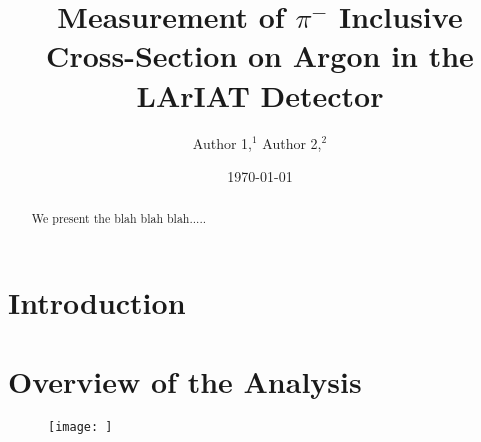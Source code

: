 \documentclass[%
 reprint,
 amsmath,amssymb,
 aps,
]{revtex4-1}
\begin{document}

\title{Measurement of $\pi^{-}$ Inclusive Cross-Section on Argon in the LArIAT Detector}%


\author{Author 1,$^{1}$ Author 2,$^{2}$ \\}



\date{\today}%

\begin{abstract}
We present the blah blah blah.....


\end{abstract}

\maketitle


\section{Introduction}\label{sec:Introduction}


\section{Overview of the Analysis}\label{sec:AnaOverview}

\begin{figure}[h]
\texttt{[image: ]}\hspace{2pc}%
\begin{minipage}[b]{14pc}\caption{\label{fig:}} 
\end{minipage}
\end{figure}
\end{document}
